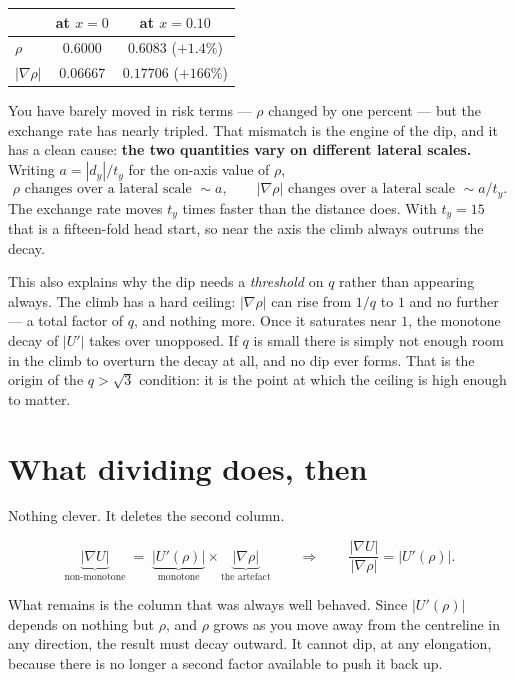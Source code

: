 \documentclass[11pt]{article}
\begin{document}
\begin{center}
\begin{tabular}{lcc}
\toprule
 & at $x=0$ & at $x=0.10$\\
\midrule
$\rho$          & $0.6000$  & $0.6083$ \quad($+1.4\%$)\\
$|\nabla\rho|$  & $0.06667$ & $0.17706$ \quad($+166\%$)\\
\bottomrule
\end{tabular}
\end{center}

You have barely moved in risk terms --- $\rho$ changed by one percent --- but
the exchange rate has nearly tripled. That mismatch is the engine of the
dip, and it has a clean cause: \textbf{the two quantities vary on different
lateral scales.} Writing $a=|d_{y}|/t_{y}$ for the on-axis value of $\rho$,
\[
  \rho \text{ changes over a lateral scale } \sim a,
  \qquad
  |\nabla\rho| \text{ changes over a lateral scale } \sim a/t_{y} .
\]
The exchange rate moves $t_{y}$ times faster than the distance does. With
$t_{y}=15$ that is a fifteen-fold head start, so near the axis the climb
always outruns the decay.

This also explains why the dip needs a \emph{threshold} on $q$ rather than
appearing always. The climb has a hard ceiling: $|\nabla\rho|$ can rise from
$1/q$ to $1$ and no further --- a total factor of $q$, and nothing more.
Once it saturates near $1$, the monotone decay of $|U'|$ takes over
unopposed. If $q$ is small there is simply not enough room in the climb to
overturn the decay at all, and no dip ever forms. That is the origin of the
$q>\sqrt3$ condition: it is the point at which the ceiling is high enough to
matter.

\section{What dividing does, then}

Nothing clever. It deletes the second column.

\[
  \underbrace{|\nabla U|}_{\text{non-monotone}}
  \;=\;
  \underbrace{|U'(\rho)|}_{\text{monotone}}
  \times
  \underbrace{|\nabla\rho|}_{\text{the artefact}}
  \qquad\Longrightarrow\qquad
  \frac{|\nabla U|}{|\nabla\rho|}=|U'(\rho)| .
\]

What remains is the column that was always well behaved. Since $|U'(\rho)|$
depends on nothing but $\rho$, and $\rho$ grows as you move away from the
centreline in any direction, the result must decay outward. It cannot dip,
at any elongation, because there is no longer a second factor available to
push it back up.
\end{document}
